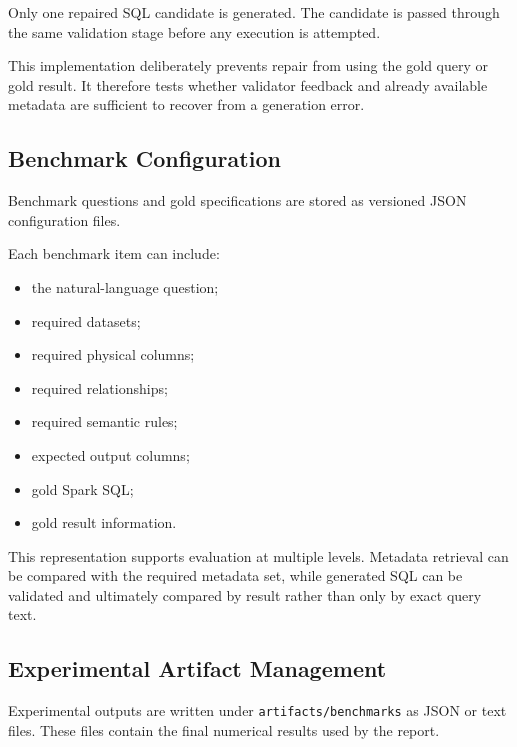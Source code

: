 Only one repaired SQL candidate is generated. The candidate is passed through
the same validation stage before any execution is attempted.

This implementation deliberately prevents repair from using the gold query or
gold result. It therefore tests whether validator feedback and already
available metadata are sufficient to recover from a generation error.


\subsection{Benchmark Configuration}

Benchmark questions and gold specifications are stored as versioned JSON
configuration files.

Each benchmark item can include:

\begin{itemize}

    \item the natural-language question;

    \item required datasets;

    \item required physical columns;

    \item required relationships;

    \item required semantic rules;

    \item expected output columns;

    \item gold Spark SQL;

    \item gold result information.

\end{itemize}

This representation supports evaluation at multiple levels. Metadata
retrieval can be compared with the required metadata set, while generated SQL
can be validated and ultimately compared by result rather than only by exact
query text.


\subsection{Experimental Artifact Management}

Experimental outputs are written under \texttt{artifacts/benchmarks} as JSON
or text files. These files contain the final numerical results used by the
report.


